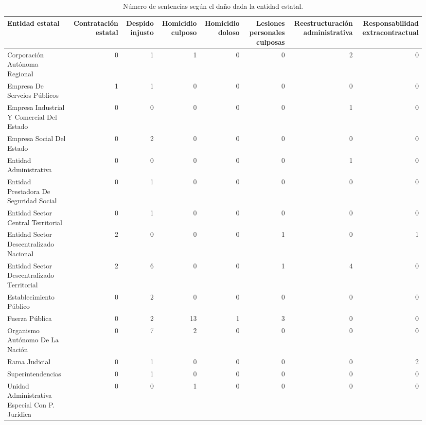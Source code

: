 \begin{table}[!htbp]
\centering
\caption{Número de sentencias según el daño dada la entidad estatal.} 
\label{tab:entidaddano}
\begin{tabular}{lrrrrrrr}
  \hline
Entidad estatal & Contratación estatal & Despido injusto & Homicidio culposo & Homicidio doloso & Lesiones personales culposas & Reestructuración administrativa & Responsabilidad extracontractual \\ 
  \hline
Corporación Autónoma Regional &  0 &  1 &  1 &  0 &  0 &  2 &  0 \\ 
  Empresa De Servcios Públicos &  1 &  1 &  0 &  0 &  0 &  0 &  0 \\ 
  Empresa Industrial Y Comercial Del Estado &  0 &  0 &  0 &  0 &  0 &  1 &  0 \\ 
  Empresa Social Del Estado &  0 &  2 &  0 &  0 &  0 &  0 &  0 \\ 
  Entidad Administrativa &  0 &  0 &  0 &  0 &  0 &  1 &  0 \\ 
  Entidad Prestadora De Seguridad Social &  0 &  1 &  0 &  0 &  0 &  0 &  0 \\ 
  Entidad Sector Central Territorial &  0 &  1 &  0 &  0 &  0 &  0 &  0 \\ 
  Entidad Sector Descentralizado Nacional &  2 &  0 &  0 &  0 &  1 &  0 &  1 \\ 
  Entidad Sector Descentralizado Territorial &  2 &  6 &  0 &  0 &  1 &  4 &  0 \\ 
  Establecimiento Público &  0 &  2 &  0 &  0 &  0 &  0 &  0 \\ 
  Fuerza Pública &  0 &  2 & 13 &  1 &  3 &  0 &  0 \\ 
  Organismo Autónomo De La Nación &  0 &  7 &  2 &  0 &  0 &  0 &  0 \\ 
  Rama Judicial &  0 &  1 &  0 &  0 &  0 &  0 &  2 \\ 
  Superintendencias &  0 &  1 &  0 &  0 &  0 &  0 &  0 \\ 
  Unidad Administrativa Especial Con P. Jurídica &  0 &  0 &  1 &  0 &  0 &  0 &  0 \\ 
   \hline
\end{tabular}
\end{table}
